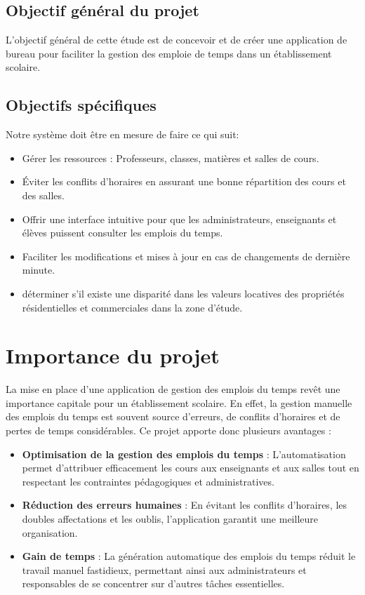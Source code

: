 \documentclass[english,12pt,a4paper]{report}
\begin{document}
\subsection{Objectif général du projet}

L'objectif général de cette étude est de concevoir et de créer une application de bureau pour faciliter la gestion des emploie de temps dans un établissement scolaire.

\subsection{Objectifs spécifiques}
Notre système doit être en mesure de faire ce qui suit:
\begin{itemize}
	\item Gérer les ressources : Professeurs, classes, matières et salles de cours.
	\item Éviter les conflits d’horaires en assurant une bonne répartition des cours et des salles.
	\item Offrir une interface intuitive pour que les administrateurs, enseignants et élèves puissent consulter les emplois du temps.
	\item Faciliter les modifications et mises à jour en cas de changements de dernière minute.
	\item déterminer s'il existe une disparité dans les valeurs locatives des propriétés résidentielles et commerciales dans la zone d'étude.
	
\end{itemize}


\section{Importance du projet }
La mise en place d’une application de gestion des emplois du temps revêt une importance capitale pour un établissement scolaire. En effet, la gestion manuelle des emplois du temps est souvent source d’erreurs, de conflits d’horaires et de pertes de temps considérables. Ce projet apporte donc plusieurs avantages :

\begin{itemize}
	\item \textbf{Optimisation de la gestion des emplois du temps} : L’automatisation permet d’attribuer efficacement les cours aux enseignants et aux salles tout en respectant les contraintes pédagogiques et administratives.
	\item \textbf{Réduction des erreurs humaines} : En évitant les conflits d’horaires, les doubles affectations et les oublis, l’application garantit une meilleure organisation.
	\item \textbf{Gain de temps} : La génération automatique des emplois du temps réduit le travail manuel fastidieux, permettant ainsi aux administrateurs et responsables de se concentrer sur d’autres tâches essentielles.
\end{itemize}
\end{document}
